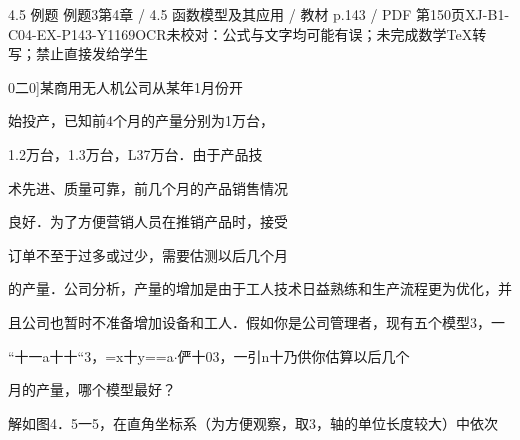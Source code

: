 \begin{bankitem}{4.5 例题 例题3}{第4章 / 4.5 函数模型及其应用 / 教材 p.143 / PDF 第150页}{XJ-B1-C04-EX-P143-Y1169}{OCR未校对：公式与文字均可能有误；未完成数学TeX转写；禁止直接发给学生}
\begin{ocrdraft}
\par
0二0]某商用无人机公司从某年1月份开
\par
始投产，已知前4个月的产量分别为1万台，
\par
1.2万台，1.3万台，L37万台．由于产品技
\par
术先进、质量可靠，前几个月的产品销售情况
\par
良好．为了方便营销人员在推销产品时，接受
\par
订单不至于过多或过少，需要估测以后几个月
\par
的产量．公司分析，产量的增加是由于工人技术日益熟练和生产流程更为优化，并
\par
且公司也暂时不准备增加设备和工人．假如你是公司管理者，现有五个模型3，一
\par
“十一a十十“3，=x十y==a\ensuremath{\cdot}俨十03，一引n十乃供你估算以后几个
\par
月的产量，哪个模型最好？
\par
解如图4．5一5，在直角坐标系（为方便观察，取3，轴的单位长度较大）中依次
\end{ocrdraft}
\end{bankitem}
